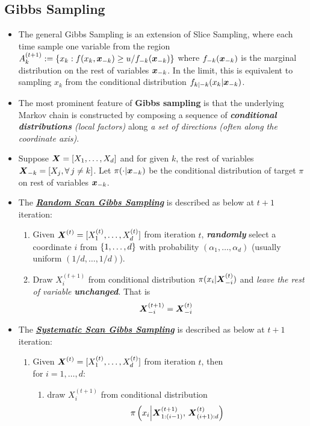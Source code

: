 \documentclass[11pt]{article}
\begin{document}
\subsection{Gibbs Sampling}
\begin{itemize}
\item The general Gibbs Sampling is an extension of Slice Sampling, where each time sample one variable from the region $A^{(t+1)}_{k} := \left\{x_k: f(x_k, \boldsymbol{x}_{-k}) \ge u/ f_{-k}(\boldsymbol{x}_{-k})\right\}$ where $f_{-k}(\boldsymbol{x}_{-k})$ is the marginal distribution on the rest of  variables $\boldsymbol{x}_{-k}$. In the limit, this is equivalent to sampling $x_{k}$ from the conditional distribution $f_{k|-k}(x_k|\boldsymbol{x}_{-k})$.

\item The most prominent feature of \textbf{Gibbs sampling} is that the underlying Markov chain is constructed by composing a sequence of \emph{\textbf{conditional distributions} (local factors)} along \emph{a set of directions (often along the coordinate axis)}. 

\item Suppose $\boldsymbol{X} = [X_1, \ldots, X_d]$ and for given $k$, the rest of variables $\boldsymbol{X}_{-k} = [X_j, \forall\,j\neq k]$. Let $\pi(\cdot|\boldsymbol{x}_{-k})$ be the conditional distribution of target $\pi$ on rest of variables $\boldsymbol{x}_{-k}$.

\item The \underline{\emph{\textbf{Random Scan Gibbs Sampling}}} is described as below at $t+1$ iteration:
\begin{enumerate}
\item Given $\boldsymbol{X}^{(t)} = [X_1^{(t)}, \ldots, X_d^{(t)}]$ from iteration $t$, \emph{\textbf{randomly}} select a coordinate $i$ from $\left\{1,\ldots, d\right\}$ with probability $(\alpha_1, \ldots, \alpha_d)$ (usually uniform $(1/d, \ldots, 1/d)$).
\item Draw $X_{i}^{(t+1)}$ from conditional distribution $\pi(x_i|\boldsymbol{X}_{-i}^{(t)})$ and \emph{leave the rest of variable} \emph{\textbf{unchanged}}. That is
\begin{align*}
\boldsymbol{X}_{-i}^{(t+1)} &= \boldsymbol{X}_{-i}^{(t)}
\end{align*}
\end{enumerate}

\item The \underline{\emph{\textbf{Systematic Scan Gibbs Sampling}}} is described as below at $t+1$ iteration:
\begin{enumerate}
\item Given $\boldsymbol{X}^{(t)} = [X_1^{(t)}, \ldots, X_d^{(t)}]$ from iteration $t$, then\\
      for $i=1,\ldots, d$: 
      \begin{enumerate}
      \item draw $X_{i}^{(t+1)}$ from conditional distribution 
      \begin{align*}
      \pi \left(x_i \Big|\boldsymbol{X}_{1:(i-1)}^{(t+1)},\, \boldsymbol{X}_{(i+1):d}^{(t)}\right)
      \end{align*}
      \end{enumerate}
\end{enumerate}


\end{itemize}
\end{document}
